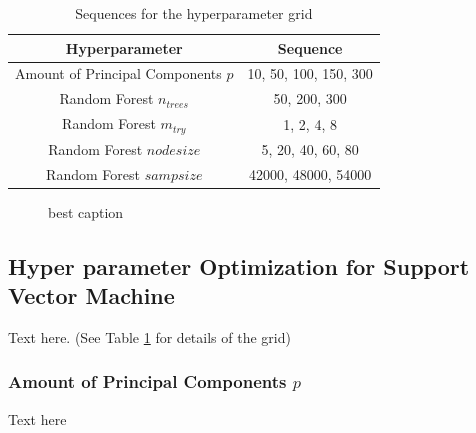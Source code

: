 \documentclass[conference]{IEEEtran}
\begin{document}
\begin{table}[htbp]
    \color{maxim}
    \caption{\color{til}Sequences for the hyperparameter grid}
    \begin{center}
    \begin{tabular}{|c|c|}
        \hline
        \textbf{Hyperparameter} & \textbf{Sequence} \\
        \hline
        Amount of Principal Components $p$ & 10, 50, 100, 150, 300\\
        \hline
        Random Forest $n_{trees}$ & 50, 200, 300\\
        \hline
        Random Forest $m_{try}$ & 1, 2, 4, 8\\
        \hline
        Random Forest ${nodesize}$ & 5, 20, 40, 60, 80\\
        \hline
        Random Forest ${sampsize}$ & 42000, 48000, 54000\\
        \hline
    \end{tabular}
    \label{table:gridParamSVM}
    \end{center}
\end{table}


\begin{figure}[ht!]
    \centering

    \quad
    \quad
    \quad


    \caption{
        \color{maxim}
        best caption
    }
    \label{fig:hyper:mtry}
\end{figure}

\subsection{Hyper parameter Optimization for Support Vector Machine}\label{sec:hyper:svm}
\textcolor{maxim}{
    Text here.
    (See Table \ref{table:gridParamSVM} for details of the grid) 
    \subsubsection{Amount of Principal Components $p$}
    Text here
}
\end{document}
